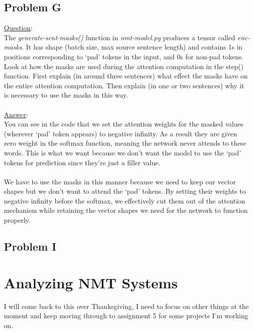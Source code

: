 \documentclass[12pt]{article}
\begin{document}
\subsection{Problem G}
\underline{Question}:
~\\
The \emph{generate-sent-masks()} function in \emph{nmt-model.py} produces a tensor 
called \emph{enc-masks}. It has shape (batch size, max source sentence length) 
and contains 1s in positions corresponding to ‘pad’ tokens in the input, 
and 0s for non-pad tokens. Look at how the masks are used during the 
attention computation in the step() function.
First explain (in around three sentences) what effect the masks have 
on the entire attention computation. Then explain (in one or two 
sentences) why it is necessary to use the masks in this way.
~\\
~\\
\underline{Answer}: 
~\\
You can see in the code that we set the attention weights for the masked 
values (wherever ‘pad’ token appears) to negative infinity. As a result 
they are given zero weight in the softmax function, meaning the network 
never attends to these words. This is what we want because we don't want 
the model to use the ‘pad’ tokens for prediction since they're just a filler 
value. 
~\\
~\\
We have to use the masks in this manner because we need to keep our 
vector shapes but we don't want to attend the ‘pad’ tokens. By setting 
their weights to negative infinity before the softmax, we effectively 
cut them out of the attention mechanism while retaining the vector shapes 
we need for the network to function properly. 

\subsection{Problem I}

\section{Analyzing NMT Systems}
I will come back to this over Thanksgiving, I need to focus on other things 
at the moment and keep moving through to assignment 5 for some projects 
I'm working on. 
\end{document}
